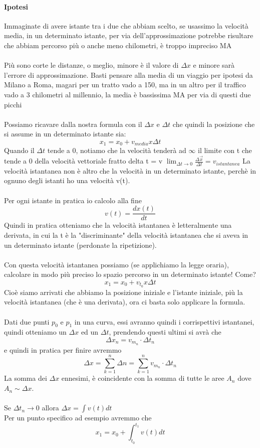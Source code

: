 \documentclass[12pt, a4paper, openany, oneside]{book}
\begin{document}
\paragraph{Ipotesi} Immaginate di avere istante tra i due che abbiam scelto,
se usassimo la velocità media, in un determinato istante, per via dell'approssimazione
potrebbe risultare che abbiam percorso più o anche meno chilometri, è troppo
impreciso MA
\\ \\
Più sono corte le distanze, o meglio, minore è il valore di $\Delta x$ e minore
sarà l'errore di approssimazione. Basti pensare alla media di un viaggio per
ipotesi da Milano a Roma, magari per un tratto vado a 150, ma in un altro per 
il traffico vado a 3 chilometri al millennio, la media è bassissima MA per via
di questi due picchi
\\ \\
Possiamo ricavare dalla nostra formula con il $\Delta x$ e $\Delta t$ che quindi
la posizione che si assume in un determinato istante sia:
$$x_{1} = x_{0} + v_{media} x \Delta t$$
Quando il $\Delta t$ tende a 0, notiamo che la velocità tenderà ad $\infty$
il limite con t che tende a 0 della velocità vettoriale fratto delta t = v
$\lim_{\Delta t \to 0} \frac{\Delta \vec{x}}{\Delta t} = v_{istantanea}$
La velocità istantanea non è altro che la velocità in un determinato istante,
perchè in ognuno degli istanti ho una velocità v(t). \\ \\
Per ogni istante in pratica io calcolo alla fine 
$$v(t) = \frac{dx(t)}{dt}$$
Quindi in pratica otteniamo che la velocità istantanea è letteralmente una 
derivata, in cui la t è la "discriminante" della velocità istantanea che si 
aveva in un determinato istante (perdonate la ripetizione).
\\ \\ 
Con questa velocità istantanea possiamo (se applichiamo la legge oraria), 
calcolare in modo più preciso lo spazio percorso in un determinato istante! Come?
$$x_{1} = x_{0} + v_{t_{0}} x \Delta t$$
Cioè siamo arrivati che abbiamo la posizione iniziale e l'istante iniziale, più
la velocità istantanea (che è una derivata), ora ci basta solo applicare la 
formula. 
\\ \\ 
Dati due punti $p_{0}$ e $p_{1}$ in una curva, essi avranno quindi i corrispettivi 
istantanei, quindi otteniamo un $\Delta x$ ed un $\Delta t$, prendendo questi 
ultimi si avrà che $$\Delta x_{n} = v_{m_{n}} \cdot \Delta t_{n}$$ e quindi in 
pratica per finire avremmo
$$\Delta x = \sum_{k=1}^n \Delta n = \sum_{k=1}^n v_{m_{n}} \cdot \Delta t_{n}$$
La somma dei $\Delta x$ ennesimi, è coincidente con la somma di tutte le aree
$A_{n}$ dove $A_{n} \sim \Delta x$. \\ \\
Se $\Delta t_{n} \to 0$ allora $\Delta x = \int v(t) dt$ \\
Per un punto specifico ad esempio avremmo che 
$$x_{1} = x_{0} + \int_{t_{0}}^{t_{1}} v(t) dt $$
\end{document}
